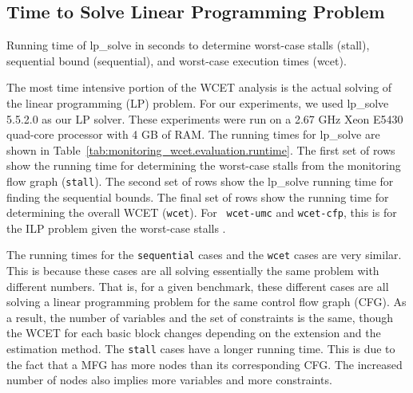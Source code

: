 \subsection{Time to Solve Linear Programming Problem}
\label{sec:monitoring_wcet.evaluation.lptime}

\begin{table}
  \begin{center}
    \begin{tiny}
    
    \end{tiny}
    \caption{Running time of lp\_solve in seconds to determine worst-case stalls
    (stall), sequential bound (sequential), and worst-case execution times (wcet).}
    \label{tab:monitoring_wcet.evaluation.runtime}
  \end{center}
\end{table}

The most time intensive portion of the WCET analysis is the actual solving of
the linear programming (LP) problem. For our experiments, we used lp\_solve
5.5.2.0 \cite{lpsolve} as our LP solver. These experiments were run on a 2.67
GHz Xeon E5430 quad-core processor with 4 GB of RAM. The running times for
lp\_solve are shown in Table~\ref{tab:monitoring_wcet.evaluation.runtime}.  The
first set of rows show the running time for determining the worst-case stalls
from the monitoring flow graph ({\tt stall}). The second set of rows show the
lp\_solve running time for finding the sequential bounds. The final set of rows
show the running time for determining the overall WCET ({\tt wcet}). For {\tt
wcet-umc} and {\tt wcet-cfp}, this is for the ILP problem given the worst-case
stalls .

The running times for the {\tt sequential} cases and the {\tt wcet} cases are
very similar. This is because these cases are all solving essentially the same
problem with different numbers. That is, for a given benchmark, these different
cases are all solving a linear programming problem for the same control flow
graph (CFG). As a result, the number of variables and the set of constraints is
the same, though the WCET for each basic block changes depending on the
extension and the estimation method. The {\tt stall} cases have a longer
running time.  This is due to the fact that a MFG has more nodes than its
corresponding CFG.  The increased number of nodes also implies more variables
and more constraints.

